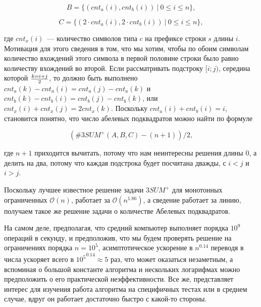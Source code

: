\begin{equation}
B = \{ (cnt_a(i), cnt_b(i))\ |\ 0 \le i \le n \},
\end{equation}

\begin{equation}
C = \{ (2 \cdot cnt_a(i), 2 \cdot cnt_b(i))\ |\ 0 \le i \le n \},
\end{equation}


где $cnt_x(i)$~--- количество символов типа $c$ на префиксе строки $s$ длины $i$. Мотивация для этого сведения в том, что мы хотим, чтобы по обоим символам количество вхождений этого символа в первой половине строки было равно количеству вхождений во второй. Если рассматривать подстроку $[i; j)$, середина которой $k={i+j} \over 2$, то должно быть выполнено $cnt_a(k)-cnt_a(i)=cnt_a(j)-cnt_a(k)$ и $cnt_b(k)-cnt_b(i)=cnt_b(j)-cnt_b(k)$, или $cnt_x(i)+cnt_x(j)=2cnt_x(k)$. Поскольку $cnt_a(i)+cnt_b(i)=i$, становится понятно, что число абелевых подквадратов можно найти по формуле 

\begin{equation}
(\#3SUM^+(A, B, C) - (n+1)) / 2,
\end{equation}

где $n+1$ приходится вычитать, потому что нам неинтересны решения длины 0, а делить на два, потому что каждая подстрока будет посчитана дважды, с $i<j$ и $i>j$.

Поскольку лучшее известное решение задачи $3SUM^+$ для монотонных ограниченных $\mathcal{O}(n)$, работает за $\mathcal{O}(n^{1.86})$, а сведение работает за линию, получаем такое же решение задачи о количестве Абелевых подквадратов.

На самом деле, предполагая, что средний компьютер выполняет порядка $10^9$ операций в секунду, и предположив, что мы будем проверять решение на ограничениях порядка $n=10^5$, асимптотическое ускорение в $n^{0.14}$ переводя в числа ускоряет всего в ${10^5}^{0.14} \approx 5$ раз, что может оказаться незаметным, а вспоминая о большой константе алгоритма и нескольких логарифмах можно предположить о его практической неэффективности. Все же, представляет интерес для изучения работа алгоритма на специфичных тестах или в среднем случае, вдруг он работает достаточно быстро с какой-то стороны.

